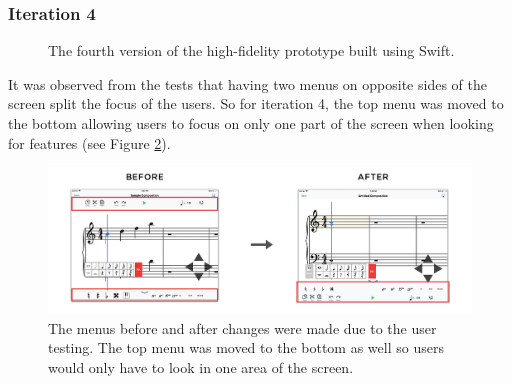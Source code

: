 			\subsubsection{Iteration 4}

				\begin{figure}[H]
					\centering
				    \caption{The fourth version of the high-fidelity prototype built using Swift.}
				    \label{fig:flow_it4}
				\end{figure} 

				It was observed from the tests that having two menus on opposite sides of the screen split the focus of the users. So for iteration 4, the top menu was moved to the bottom allowing users to focus on only one part of the screen when looking for features (see Figure \ref{fig:before-after-menu}). 

				\begin{figure}[h]
					\centering
					\includegraphics[scale=0.28]{figures/before-after-menu}
				    \caption{The menus before and after changes were made due to the user testing. The top menu was moved to the bottom as well so users would only have to look in one area of the screen.}
				    \label{fig:before-after-menu}
				\end{figure}

